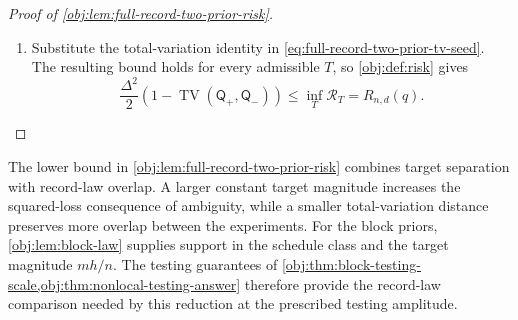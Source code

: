 \documentclass[11pt]{article}
\begin{document}
\begin{proof}[Proof of \cref{obj:lem:full-record-two-prior-risk}]
\begin{enumerate}
On \(\mathcal E_T\), \(T(o,\xi)<0\) and \(\Delta>0\), so
\((T(o,\xi)-\Delta)^2\ge\Delta^2\). On its complement,
\(T(o,\xi)\ge0\), so \((T(o,\xi)+\Delta)^2\ge\Delta^2\).
Together with nonnegativity off the respective events, these give the pointwise bounds
\[
\Delta^2\mathbf1_{\mathcal E_T}(o,\xi)
\le (T(o,\xi)-\Delta)^2,
\qquad
\Delta^2\mathbf1_{\mathcal E_T^c}(o,\xi)
\le (T(o,\xi)+\Delta)^2.
\]
Integrating under the corresponding augmented laws yields
\[
\Delta^2\mathsf Q_+^{\mathrm{aug}}(\mathcal E_T)
\le\mathcal L_{\mathrm{mix},+}(T),
\qquad
\Delta^2\mathsf Q_-^{\mathrm{aug}}(\mathcal E_T^c)
\le\mathcal L_{\mathrm{mix},-}(T).
\]

Combining these bounds in order gives
\[
\begin{aligned}
\Delta^2\left(
1-\operatorname{TV}
\bigl(\mathsf Q_+^{\mathrm{aug}},\mathsf Q_-^{\mathrm{aug}}\bigr)
\right)
&\le
\Delta^2\left(
\mathsf Q_+^{\mathrm{aug}}(\mathcal E_T)
+\mathsf Q_-^{\mathrm{aug}}(\mathcal E_T^c)
\right)\\
&\le
\mathcal L_{\mathrm{mix},+}(T)
+\mathcal L_{\mathrm{mix},-}(T)\\
&\le 2\mathcal R_T.
\end{aligned}
\]
Cancelling the positive finite factor \(2\), which is valid also for extended nonnegative risks, proves
\[
\frac{\Delta^2}{2}\left(
1-\operatorname{TV}
\bigl(\mathsf Q_+^{\mathrm{aug}},\mathsf Q_-^{\mathrm{aug}}\bigr)
\right)
\le\mathcal R_T.
\]

\item Substitute the total-variation identity in \cref{eq:full-record-two-prior-tv-seed}. The resulting bound holds for every admissible \(T\), so \cref{obj:def:risk} gives
\[
\frac{\Delta^2}{2}
\left(1-\operatorname{TV}(\mathsf Q_+,\mathsf Q_-)\right)
\le
\inf_T\mathcal R_T
=
R_{n,d}(q).
\]
\end{enumerate}
\end{proof}

The lower bound in \cref{obj:lem:full-record-two-prior-risk} combines target separation with record-law overlap. A larger constant target magnitude increases the squared-loss consequence of ambiguity, while a smaller total-variation distance preserves more overlap between the experiments. For the block priors, \cref{obj:lem:block-law} supplies support in the schedule class and the target magnitude \(mh/n\). The testing guarantees of \cref{obj:thm:block-testing-scale,obj:thm:nonlocal-testing-answer} therefore provide the record-law comparison needed by this reduction at the prescribed testing amplitude.
\end{document}
